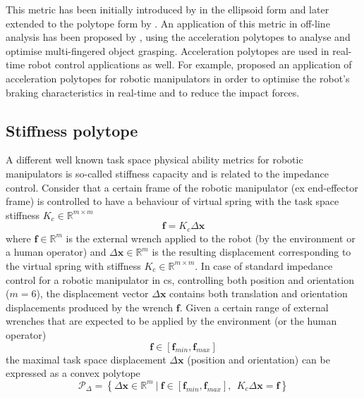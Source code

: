 This metric has been initially introduced by \citet{chiacchio_2000} in the ellipsoid form and later extended to the polytope form by \citet{rosenstein2002velocity}. An application of this metric in off-line analysis has been proposed by \citet{jang_grasp_2009}, using the acceleration polytopes to analyse and optimise multi-fingered object grasping. Acceleration polytopes are used in real-time robot control applications as well. For example, \citet{jeong2006optimal} proposed an application of acceleration polytopes for robotic manipulators in order to optimise the robot's braking characteristics in real-time and to reduce the impact forces. 

\subsection{Stiffness polytope}
\label{ch:robot_stiffness_poly}
A different well known task space physical ability metrics for robotic manipulators is so-called stiffness capacity and is related to the impedance control. Consider that a certain frame of the robotic manipulator (ex end-effector frame) is controlled to have a behaviour of virtual spring with the task space stiffness $K_c \in \mathbb{R}^{m\times m}$
\begin{equation}
    \bm{f} = K_c \Delta\bm{x}
\end{equation}
where $\bm{f}\in\mathbb{R}^m$ is the external wrench applied to the robot (by the environment or a human operator) and $\Delta \bm{x}\in\mathbb{R}^m$ is the resulting displacement corresponding to the virtual spring with stiffness $K_c\in\mathbb{R}^{m\times m}$.  In case of standard impedance control for a robotic manipulator in \gls{cs}, controlling both position and orientation ($m=6$), the displacement vector $\Delta \bm{x}$ contains both translation and orientation displacements produced by the wrench $\bm{f}$.
Given a certain range of external wrenches that are expected to be applied by the environment (or the human operator) 
\begin{equation}
    \bm{f}\in\left[\bm{f}_{min}, \bm{f}_{max} \right]
    \label{eq:force_stiff_range}
\end{equation}
the maximal task space displacement $\Delta \bm{x}$ (position and orientation) can be expressed as a convex polytope 
\begin{equation}
    \mathcal{P}_\Delta = \left\{ \Delta\bm{x} \in \mathbb{R}^m ~|~ \bm{f}\in\left[\bm{f}_{min}, \bm{f}_{max} \right], ~~ K_c\Delta\bm{x} = \bm{f} \right\}
\end{equation}

